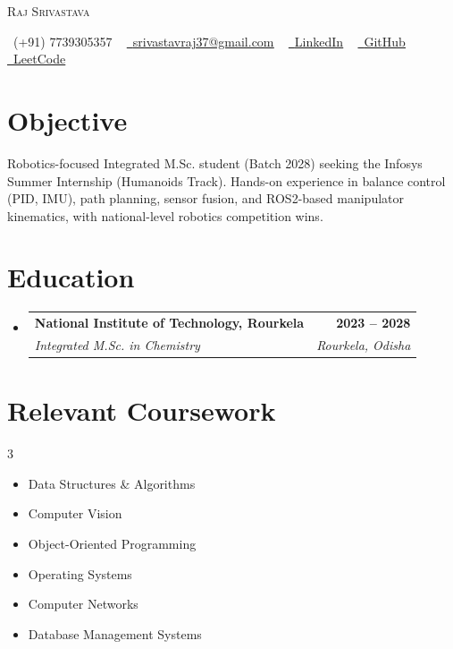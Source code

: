 \documentclass[letterpaper,11pt]{article}
\makeatletter
\newcommand{\resumeSubheading}[4]{
  \vspace{-2pt}\item
    \begin{tabular*}{1.0\textwidth}[t]{l@{\extracolsep{\fill}}r}
      \textbf{#1} & \textbf{\small #2} \\
      \textit{\small#3} & \textit{\small #4} \\
    \end{tabular*}\vspace{-7pt}
}
\newcommand{\resumeSubHeadingListStart}{\begin{itemize}[leftmargin=0.0in, label={}]}
\newcommand{\resumeSubHeadingListEnd}{\end{itemize}}
\makeatother
\begin{document}
\begin{center}
      {\Huge \scshape Raj Srivastava} \\ \vspace{5pt}

    \small \raisebox{-0.1\height}\faPhone\ (+91) 7739305357 ~ \href{mailto:srivastavraj37@gmail.com}{\raisebox{-0.2\height}\faEnvelope\  \underline{srivastavraj37@gmail.com}} ~
    \href{https://www.linkedin.com/in/raj-srivastava-b11790288/}{\raisebox{-0.2\height}\faLinkedin\ \underline{LinkedIn}}  ~
    \href{https://github.com/srivastavaraj37}{\raisebox{-0.2\height}\faGithub\ \underline{GitHub}} ~
    \href{https://leetcode.com/u/rajsrivastava3_0/}{\raisebox{-0.2\height}\faCode\ \underline{LeetCode}}
    \vspace{-8pt}
\end{center}

\section{Objective}
\small Robotics-focused Integrated M.Sc. student (Batch 2028) seeking the Infosys Summer Internship (Humanoids Track). Hands-on experience in balance control (PID, IMU), path planning, sensor fusion, and ROS2-based manipulator kinematics, with national-level robotics competition wins.
\vspace{-6pt}

\section{Education}
  \resumeSubHeadingListStart
    \resumeSubheading
      {National Institute of Technology, Rourkela}{2023 -- 2028}
      {Integrated M.Sc. in Chemistry}{Rourkela, Odisha}
  \resumeSubHeadingListEnd

\section{Relevant Coursework}

        \begin{multicols}{3}
            \begin{itemize}[itemsep=-5pt, parsep=3pt]
                \item\small Data Structures \& Algorithms
                \item Computer Vision
                \item Object-Oriented Programming
                \item Operating Systems
                \item Computer Networks
                \item Database Management Systems
            \end{itemize}
        \end{multicols}
        \vspace*{2.0\multicolsep}
\end{document}
